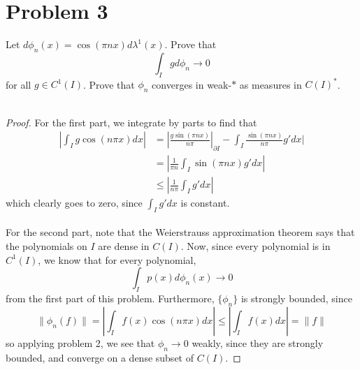 \documentclass[fontsize=11pt]{scrartcl} %
\numberwithin{equation}{section} %
\numberwithin{figure}{section} %
\numberwithin{table}{section} %
\begin{document}
\section*{Problem 3}
Let $d\phi_n(x) = \cos(\pi n x)d\lambda^1(x)$. Prove that
\[
    \int_I gd\phi_n \to 0
\]
for all $g\in C^1(I)$. Prove that $\phi_n$ converges in weak-$*$ as measures in
$C(I)^*$.
\\
\\
\begin{proof}
    For the first part, we integrate by parts to find that
    \[
\begin{aligned}
    |\int_I g\cos(n\pi x)dx| &= |\frac{g\sin(\pi nx)}{n\pi}|_{\partial I} -
    \int_I \frac{\sin(\pi nx)}{n\pi}g'dx|\\
    &=|\frac{1}{\pi n}\int_I\sin(\pi nx)g'dx|\\
    &\leq |\frac{1}{n\pi}\int_I g'dx|
\end{aligned}
    \]
    which clearly goes to zero, since $\int_Ig'dx$ is constant.
    \\
    \\
    For the second part, note that the Weierstrauss approximation theorem says
    that the polynomials on $I$ are dense in $C(I)$. Now, since every polynomial
    is in $C^1(I)$, we know that for every polynomial,
    \[
        \int_Ip(x)d\phi_n(x) \to 0
    \]
    from the first part of this problem. Furthermore, $\{\phi_n\}$ is strongly
    bounded, since
    \[
        \|\phi_n(f)\| = |\int_If(x)\cos(n\pi x)dx| \leq |\int_I f(x)dx| = \|f\|
    \]
    so applying problem 2, we see that $\phi_n\to 0$ weakly, since they are
    strongly bounded, and converge on a dense subset of $C(I)$. 
\end{proof}

\newpage
\end{document}
